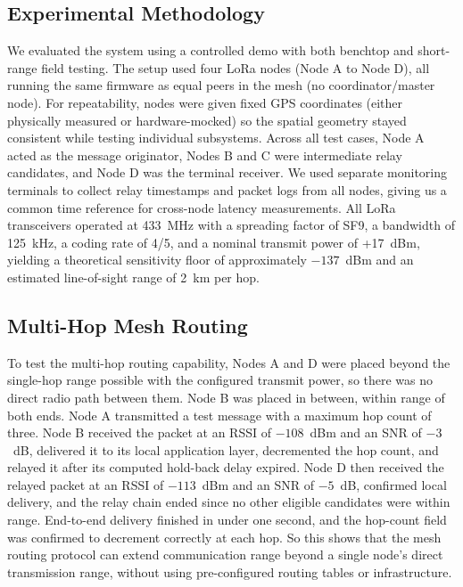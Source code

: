\subsection{Experimental Methodology}

We evaluated the system using a controlled demo with both benchtop and short-range field testing. The setup
used four LoRa nodes (Node A to Node D), all running the same firmware as equal peers in the mesh (no
coordinator/master node). For repeatability, nodes were given fixed GPS coordinates (either physically measured
or hardware-mocked) so the spatial geometry stayed consistent while testing individual subsystems. Across all
test cases, Node A acted as the message originator, Nodes B and C were intermediate relay candidates, and Node D
was the terminal receiver. We used separate monitoring terminals to collect relay timestamps and packet logs
from all nodes, giving us a common time reference for cross-node latency measurements. All LoRa transceivers
operated at 433~MHz with a spreading factor of SF9, a bandwidth of 125~kHz, a coding rate of 4/5, and a nominal
transmit power of +17~dBm, yielding a theoretical sensitivity floor of approximately $-137$~dBm and an estimated
line-of-sight range of 2~km per hop.

\subsection{Multi-Hop Mesh Routing}

To test the multi-hop routing capability, Nodes A and D were placed beyond the single-hop range possible with
the configured transmit power, so there was no direct radio path between them. Node B was placed in between,
within range of both ends. Node A transmitted a test message with a maximum hop count of three. Node B received
the packet at an RSSI of $-108$~dBm and an SNR of $-3$~dB, delivered it to its local application layer,
decremented the hop count, and relayed it after its computed hold-back delay expired. Node D then received the
relayed packet at an RSSI of $-113$~dBm and an SNR of $-5$~dB, confirmed local delivery, and the relay chain
ended since no other eligible candidates were within range. End-to-end delivery finished in under one second,
and the hop-count field was confirmed to decrement correctly at each hop. So this shows that the mesh routing
protocol can extend communication range beyond a single node's direct transmission range, without using
pre-configured routing tables or infrastructure.

